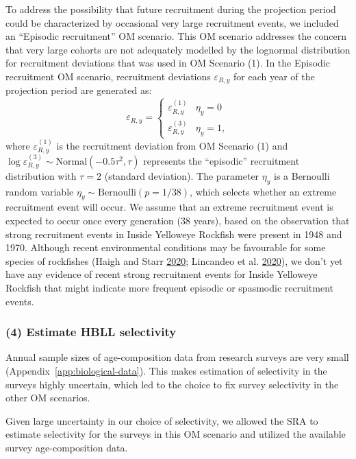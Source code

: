\documentclass[11pt]{book}
\begin{document}
To address the possibility that future recruitment during the projection period could be characterized by occasional very large recruitment events, we included an ``Episodic recruitment'' OM scenario. This OM scenario addresses the concern that very large cohorts are not adequately modelled by the lognormal distribution for recruitment deviations that was used in OM Scenario (1). In the Episodic recruitment OM scenario, recruitment deviations \(\varepsilon_{R,y}\) for each year of the projection period are generated as:
\begin{equation}
\varepsilon_{R,y} = 
\left\{
\begin{array}{ll}
\varepsilon^{(1)}_{R,y} & \eta_y = 0\\
\varepsilon^{(3)}_{R,y} & \eta_y = 1,
\end{array}
\right.
\end{equation}
where \(\varepsilon^{(1)}_{R,y}\) is the recruitment deviation from OM Scenario (1) and \(\log\varepsilon^{(3)}_{R,y} \sim \textrm{Normal}(-0.5\tau^2, \tau)\) represents the ``episodic'' recruitment distribution with \(\tau = 2\) (standard deviation). The parameter \(\eta_y\) is a Bernoulli random variable \(\eta_y \sim \textrm{Bernoulli}(p = 1/38)\), which selects whether an extreme recruitment event will occur. We assume that an extreme recruitment event is expected to occur once every generation (38 years), based on the observation that strong recruitment events in Inside Yelloweye Rockfish were present in 1948 and 1970. Although recent environmental conditions may be favourable for some species of rockfishes (Haigh and Starr \protect\hyperlink{ref-haigh2020}{2020}; Lincandeo et al. \protect\hyperlink{ref-lincandeo2020}{2020}), we don't yet have any evidence of recent strong recruitment events for Inside Yelloweye Rockfish that might indicate more frequent episodic or spasmodic recruitment events.

\hypertarget{sec:approach3-reference4}{%
\subsubsection{(4) Estimate HBLL selectivity}\label{sec:approach3-reference4}}

Annual sample sizes of age-composition data from research surveys are very small (Appendix~\ref{app:biological-data}). This makes estimation of selectivity in the surveys highly uncertain, which led to the choice to fix survey selectivity in the other OM scenarios.

Given large uncertainty in our choice of selectivity, we allowed the SRA to estimate selectivity for the surveys in this OM scenario and utilized the available survey age-composition data.
\end{document}
